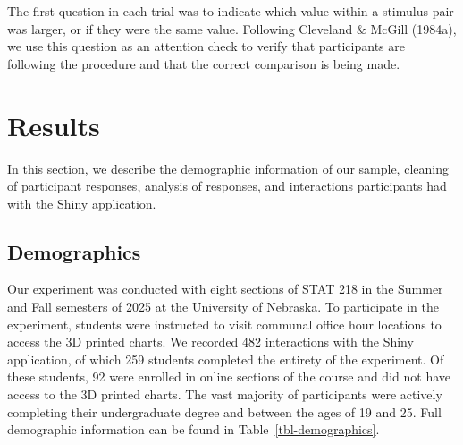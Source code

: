 \documentclass[phd]{nuthesis}
\begin{document}
The first question in each trial was to indicate which value within a
stimulus pair was larger, or if they were the same value. Following
Cleveland \& McGill (1984a), we use this question as an attention check
to verify that participants are following the procedure and that the
correct comparison is being made.

\section{Results}\label{results-2}

In this section, we describe the demographic information of our sample,
cleaning of participant responses, analysis of responses, and
interactions participants had with the Shiny application.

\subsection{Demographics}\label{demographics}

Our experiment was conducted with eight sections of STAT 218 in the
Summer and Fall semesters of 2025 at the University of Nebraska. To
participate in the experiment, students were instructed to visit
communal office hour locations to access the 3D printed charts. We
recorded 482 interactions with the Shiny application, of which 259
students completed the entirety of the experiment. Of these students, 92
were enrolled in online sections of the course and did not have access
to the 3D printed charts. The vast majority of participants were
actively completing their undergraduate degree and between the ages of
19 and 25. Full demographic information can be found in
Table~\ref{tbl-demographics}.
\end{document}
